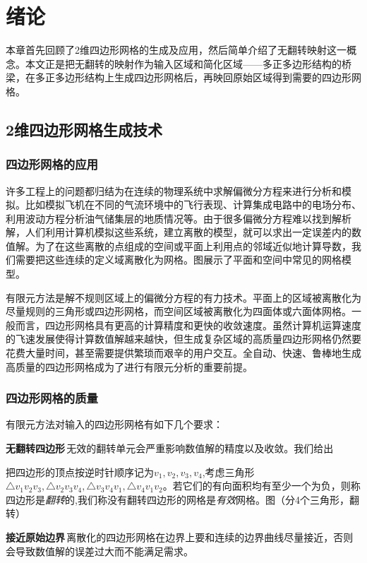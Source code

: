 \chapter{绪论}\label{intro}
本章首先回顾了2维四边形网格的生成及应用，然后简单介绍了无翻转映射这一概念。本文正是把无翻转的映射作为输入区域和简化区域——多正多边形结构的桥梁，在多正多边形结构上生成四边形网格后，再映回原始区域得到需要的四边形网格。
\section{2维四边形网格生成技术}\label{quad-teche}
\subsection{四边形网格的应用}\label{application}
许多工程上的问题都归结为在连续的物理系统中求解偏微分方程来进行分析和模拟。比如模拟飞机在不同的气流环境中的飞行表现、计算集成电路中的电场分布、利用波动方程分析油气储集层的地质情况等。由于很多偏微分方程难以找到解析解，人们利用计算机模拟这些系统，建立离散的模型，就可以求出一定误差内的数值解。为了在这些离散的点组成的空间或平面上利用点的邻域近似地计算导数，我们需要把这些连续的定义域离散化为网格。图展示了平面和空间中常见的网格模型。

有限元方法是解不规则区域上的偏微分方程的有力技术。平面上的区域被离散化为尽量规则的三角形或四边形网格，而空间区域被离散化为四面体或六面体网格。一般而言，四边形网格具有更高的计算精度和更快的收敛速度。虽然计算机运算速度的飞速发展使得计算数值解越来越快，但生成复杂区域的高质量四边形网格仍然要花费大量时间，甚至需要提供繁琐而艰辛的用户交互。全自动、快速、鲁棒地生成高质量的四边形网格成为了进行有限元分析的重要前提。
\subsection{四边形网格的质量}\label{quad-metric}
有限元方法对输入的四边形网格有如下几个要求：

\textbf{无翻转四边形}\,无效的翻转单元会严重影响数值解的精度以及收敛。我们给出
\begin{definition}\label{def:invertquad}
把四边形的顶点按逆时针顺序记为$v_1,v_2,v_3,v_4$,考虑三角形$\triangle v_1v_2v_3,\triangle v_2v_3v_4,\triangle v_3v_4v_1,\triangle v_4v_1v_2$。若它们的有向面积均有至少一个为负，则称四边形是\emph{翻转}的,我们称没有翻转四边形的网格是\emph{有效}网格。图（分4个三角形，翻转）
\end{definition}
\textbf{接近原始边界}\,离散化的四边形网格在边界上要和连续的边界曲线尽量接近，否则会导致数值解的误差过大而不能满足需求。

